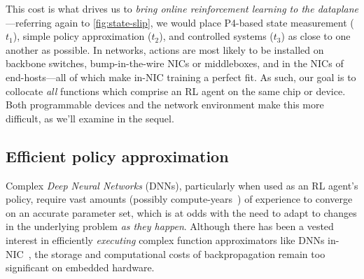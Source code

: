\documentclass[
sigconf,natbib=false
]{acmart}
\newcounter{insightc}
\newenvironment{insight}
	{
		\begin{tipblock}\refstepcounter{insightc}\textbf{Insight \theinsightc:}\em
	}
	{
		\end{tipblock}
	}
\begin{document}

This cost is what drives us to \emph{bring online reinforcement learning to the dataplane}---referring again to \cref{fig:state-slip}, we would place P4-based state measurement ($t_1$), simple policy approximation ($t_2$), and controlled systems ($t_3$) as close to one another as possible.
In networks, actions are most likely to be installed on backbone switches, bump-in-the-wire NICs or middleboxes, and in the NICs of end-hosts---all of which make in-NIC training a perfect fit.
As such, our goal is to collocate \emph{all} functions which comprise an RL agent on the same chip or device.
Both programmable devices and the network environment make this more difficult, as we'll examine in the sequel.



\subsection{Efficient policy approximation}
Complex \emph{Deep Neural Networks} (DNNs), particularly when used as an RL agent's policy, require vast amounts (possibly compute-years~\parencite{DBLP:journals/corr/abs-1912-06680}) of experience to converge on an accurate parameter set, which is at odds with the need to adapt to changes in the underlying problem \emph{as they happen}.
Although there has been a vested interest in efficiently \emph{executing} complex function approximators like DNNs in-NIC~\parencite{DBLP:journals/corr/abs-2002-08987,DBLP:journals/corr/abs-2009-02353,DBLP:conf/sigcomm/SanvitoSB18,DBLP:journals/corr/abs-1801-05731,langlet-ml-netronome}, the storage and computational costs of backpropagation remain too significant on embedded hardware.
\end{document}
